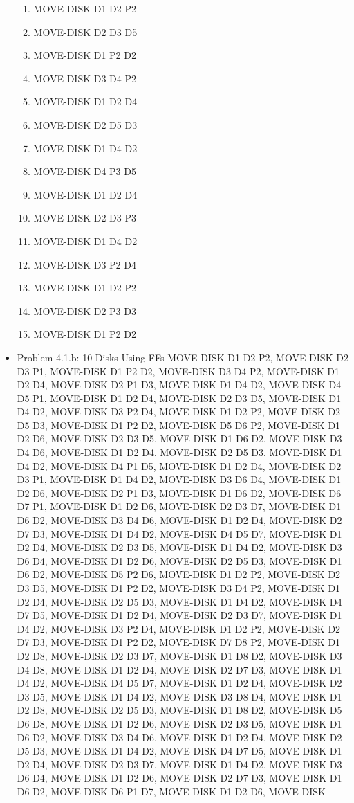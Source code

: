 \documentclass[12pt]{article}
\begin{document}
\begin{appendix}
\begin{itemize}
\begin{enumerate}
	\item  MOVE-DISK D1 D2 P2
	\item  MOVE-DISK D2 D3 D5
	\item  MOVE-DISK D1 P2 D2
	\item  MOVE-DISK D3 D4 P2
	\item  MOVE-DISK D1 D2 D4
	\item  MOVE-DISK D2 D5 D3
	\item  MOVE-DISK D1 D4 D2
	\item  MOVE-DISK D4 P3 D5
	\item  MOVE-DISK D1 D2 D4
	\item  MOVE-DISK D2 D3 P3
	\item  MOVE-DISK D1 D4 D2
	\item  MOVE-DISK D3 P2 D4
	\item  MOVE-DISK D1 D2 P2
	\item  MOVE-DISK D2 P3 D3
	\item  MOVE-DISK D1 P2 D2
      \end{enumerate}
    \item Problem 4.1.b: 10 Disks Using FFs
      \newline
 MOVE-DISK D1 D2 P2,  MOVE-DISK D2 D3 P1,  MOVE-DISK D1 P2 D2,  MOVE-DISK D3 D4 P2,  MOVE-DISK D1 D2 D4, MOVE-DISK D2 P1 D3,  MOVE-DISK D1 D4 D2,  MOVE-DISK D4 D5 P1,  MOVE-DISK D1 D2 D4,  MOVE-DISK D2 D3 D5,  MOVE-DISK D1 D4 D2,  MOVE-DISK D3 P2 D4,  MOVE-DISK D1 D2 P2,  MOVE-DISK D2 D5 D3,  MOVE-DISK D1 P2 D2,  MOVE-DISK D5 D6 P2,  MOVE-DISK D1 D2 D6,  MOVE-DISK D2 D3 D5,  MOVE-DISK D1 D6 D2,  MOVE-DISK D3 D4 D6,  MOVE-DISK D1 D2 D4,  MOVE-DISK D2 D5 D3,  MOVE-DISK D1 D4 D2,  MOVE-DISK D4 P1 D5,  MOVE-DISK D1 D2 D4,  MOVE-DISK D2 D3 P1,  MOVE-DISK D1 D4 D2,  MOVE-DISK D3 D6 D4,  MOVE-DISK D1 D2 D6,  MOVE-DISK D2 P1 D3,  MOVE-DISK D1 D6 D2,  MOVE-DISK D6 D7 P1,  MOVE-DISK D1 D2 D6,  MOVE-DISK D2 D3 D7,  MOVE-DISK D1 D6 D2,  MOVE-DISK D3 D4 D6,  MOVE-DISK D1 D2 D4,  MOVE-DISK D2 D7 D3,  MOVE-DISK D1 D4 D2,  MOVE-DISK D4 D5 D7,  MOVE-DISK D1 D2 D4,  MOVE-DISK D2 D3 D5,  MOVE-DISK D1 D4 D2,  MOVE-DISK D3 D6 D4,  MOVE-DISK D1 D2 D6,  MOVE-DISK D2 D5 D3,  MOVE-DISK D1 D6 D2,  MOVE-DISK D5 P2 D6,  MOVE-DISK D1 D2 
P2,  MOVE-DISK D2 D3 D5,  MOVE-DISK D1 P2 D2,  MOVE-DISK D3 D4 P2,  MOVE-DISK D1 D2 D4,  MOVE-DISK D2 D5 D3,  MOVE-DISK D1 D4 D2,  MOVE-DISK D4 D7 D5,  MOVE-DISK D1 D2 D4,  MOVE-DISK D2 D3 D7,  MOVE-DISK D1 D4 D2,  MOVE-DISK D3 P2 D4,  MOVE-DISK D1 D2 P2,  MOVE-DISK D2 D7 D3,  MOVE-DISK D1 P2 D2,  MOVE-DISK D7 D8 P2,  MOVE-DISK D1 D2 D8,  MOVE-DISK D2 D3 D7,  MOVE-DISK D1 D8 D2,  MOVE-DISK D3 D4 D8,  MOVE-DISK D1 D2 D4,  MOVE-DISK D2 D7 D3,  MOVE-DISK D1 D4 D2,  MOVE-DISK D4 D5 D7,  MOVE-DISK D1 D2 D4,  MOVE-DISK D2 D3 D5,  MOVE-DISK D1 D4 D2,  MOVE-DISK D3 D8 D4,  MOVE-DISK D1 D2 D8,  MOVE-DISK D2 D5 D3,  MOVE-DISK D1 D8 D2,  MOVE-DISK D5 D6 D8,  MOVE-DISK D1 D2 D6,  MOVE-DISK D2 D3 D5,  MOVE-DISK D1 D6 D2,  MOVE-DISK D3 D4 D6,  MOVE-DISK D1 D2 D4,  MOVE-DISK D2 D5 D3,  MOVE-DISK D1 D4 D2,  MOVE-DISK D4 D7 D5,  MOVE-DISK D1 D2 D4,  MOVE-DISK D2 D3 D7,  MOVE-DISK D1 D4 D2,  MOVE-DISK D3 D6 D4,  MOVE-DISK D1 D2 D6,  MOVE-DISK D2 D7 D3,  MOVE-DISK D1 D6 D2,  MOVE-DISK D6 P1 D7,  MOVE-DISK D1 D2 D6,  MOVE-DISK 

\end{itemize}
\end{appendix}
\end{document}
